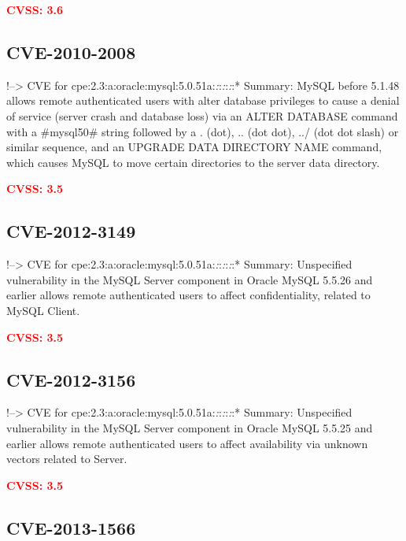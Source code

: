 \documentclass[a4paper, 12pt]{article}
\begin{document}
\textbf{\textcolor{red}{CVSS: 3.6}}

\hypertarget{cve-2010-2008}{%
\subsection{CVE-2010-2008}\label{cve-2010-2008}}

!--\textgreater{} CVE for
cpe:2.3:a:oracle:mysql:5.0.51a:\emph{:}:\emph{:}:\emph{:}:* Summary:
MySQL before 5.1.48 allows remote authenticated users with alter
database privileges to cause a denial of service (server crash and
database loss) via an ALTER DATABASE command with a \#mysql50\# string
followed by a . (dot), .. (dot dot), ../ (dot dot slash) or similar
sequence, and an UPGRADE DATA DIRECTORY NAME command, which causes MySQL
to move certain directories to the server data directory.

\textbf{\textcolor{red}{CVSS: 3.5}}

\hypertarget{cve-2012-3149}{%
\subsection{CVE-2012-3149}\label{cve-2012-3149}}

!--\textgreater{} CVE for
cpe:2.3:a:oracle:mysql:5.0.51a:\emph{:}:\emph{:}:\emph{:}:* Summary:
Unspecified vulnerability in the MySQL Server component in Oracle MySQL
5.5.26 and earlier allows remote authenticated users to affect
confidentiality, related to MySQL Client.

\textbf{\textcolor{red}{CVSS: 3.5}}

\hypertarget{cve-2012-3156}{%
\subsection{CVE-2012-3156}\label{cve-2012-3156}}

!--\textgreater{} CVE for
cpe:2.3:a:oracle:mysql:5.0.51a:\emph{:}:\emph{:}:\emph{:}:* Summary:
Unspecified vulnerability in the MySQL Server component in Oracle MySQL
5.5.25 and earlier allows remote authenticated users to affect
availability via unknown vectors related to Server.

\textbf{\textcolor{red}{CVSS: 3.5}}

\hypertarget{cve-2013-1566}{%
\subsection{CVE-2013-1566}\label{cve-2013-1566}}
\end{document}
